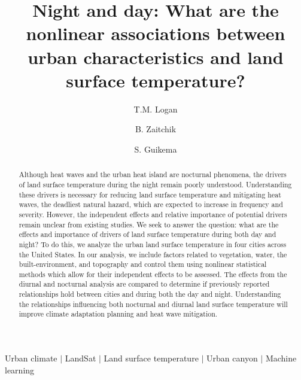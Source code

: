 \documentclass[final,3p,times,twocolumn,sort&compress]{elsarticle}
\begin{document}
\begin{frontmatter}

\title{Night and day: What are the nonlinear associations between urban characteristics and land surface temperature?}

\author[1]{T.M. Logan}

\author[2]{B. Zaitchik}
\author[1]{S. Guikema}


\address[1]{Industrial and Operations Engineering, University of Michigan, Ann Arbor, MI}
\address[2]{Earth and Planetary Sciences, Johns Hopkins University, Baltimore, MD}

\begin{abstract}
Although heat waves and the urban heat island are nocturnal phenomena, the drivers of land surface temperature during the night remain poorly understood.
Understanding these drivers is necessary for reducing land surface temperature and mitigating heat waves, the deadliest natural hazard, which are expected to increase in frequency and severity.
However, the independent effects and relative importance of potential drivers remain unclear from existing studies.
We seek to answer the question: what are the effects and importance of drivers of land surface temperature during both day and night?
To do this, we analyze the urban land surface temperature in four cities across the United States.
In our analysis, we include factors related to vegetation, water, the built-environment, and topography and control them using nonlinear statistical methods which allow for their independent effects to be assessed.
The effects from the diurnal and nocturnal analysis are compared to determine if previously reported relationships hold between cities and during both the day and night.
Understanding the relationships influencing both nocturnal and diurnal land surface temperature will improve climate adaptation planning and heat wave mitigation.
\end{abstract}

\begin{keyword}
Urban climate $|$ LandSat $|$ Land surface temperature $|$ Urban canyon $|$ Machine learning
\end{keyword}

\end{frontmatter}
\end{document}
